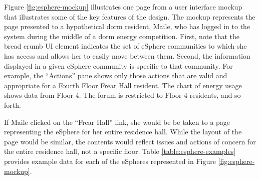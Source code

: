 Figure \ref{fig:esphere-mockup} illustrates one page from a user interface mockup that
illustrates some of the key features of the design.  The mockup represents
the page presented to a hypothetical dorm resident, Maile, who has logged
in to the system during the middle of a dorm energy competition.  First,
note that the bread crumb UI element indicates the set of eSphere
communities to which she has access and allows her to easily move between
them.  Second, the information displayed in a given eSphere community is
specific to that community.  For example, the ``Actions'' pane shows only
those actions that are valid and appropriate for a Fourth Floor Frear Hall
resident.  The chart of energy usage shows data from Floor 4.  The forum is
restricted to Floor 4 residents, and so forth.  

If Maile clicked on the ``Frear Hall'' link, she would be be taken to a
page representing the eSphere for her entire residence hall.  While the
layout of the page would be similar, the contents would reflect issues and
actions of concern for the entire residence hall, not a specific floor. 
Table \ref{table:esphere-examples} provides example data for each of the eSpheres
represented in Figure \ref{fig:esphere-mockup}.




